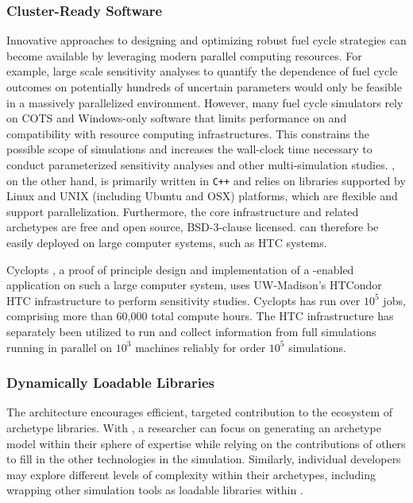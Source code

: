 \subsubsection{Cluster-Ready Software}

Innovative approaches to designing and optimizing robust fuel cycle strategies can become available by leveraging modern parallel computing resources.  For example, large scale sensitivity analyses to quantify the dependence of fuel cycle outcomes on potentially hundreds of uncertain parameters would only be feasible in a massively parallelized environment.
However, many fuel cycle simulators rely on \gls{COTS} and Windows-only software that limits
performance on and compatibility with resource computing infrastructures. This
constrains the possible scope of simulations and increases the wall-clock time necessary to conduct parameterized sensitivity
analyses and other multi-simulation studies. \Cyclus, on the other hand, is
primarily written in \texttt{C++} and relies on
libraries supported by Linux and UNIX (including Ubuntu and OSX) platforms,
which are flexible and support parallelization.
Furthermore, the core infrastructure and related archetypes are free and
open source, BSD-3-clause licensed.  \Cyclus can therefore be easily deployed
on large computer systems, such as \gls{HTC} systems.

Cyclopts \cite{gidden_cyclopts_2015}, a proof of principle design and
implementation of a \Cyclus-enabled application on such a large computer system,
uses UW-Madison's HTCondor \gls{HTC} infrastructure to perform sensitivity
studies. Cyclopts has run over $10^5$ jobs, comprising more than 60,000 total
compute hours. The \gls{HTC} infrastructure has separately been utilized to
run and collect information from full \Cyclus simulations running in parallel
on $10^3$ machines reliably for order $10^5$ simulations.

\subsubsection{Dynamically Loadable Libraries}

The \Cyclus architecture encourages efficient, targeted contribution to the ecosystem of
archetype libraries.
With \Cyclus, a researcher can focus on generating an archetype model within their
sphere of expertise while relying on the contributions of others to fill
in the other technologies in the simulation.
Similarly, individual developers may explore different levels of complexity within their archetypes, including
wrapping other simulation tools as loadable libraries within \Cyclus.

